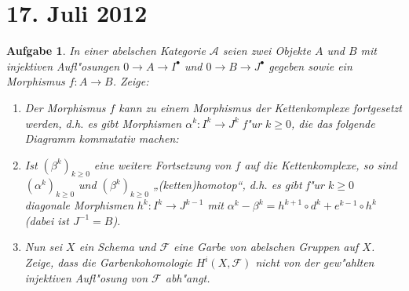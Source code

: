 \documentclass[paper = A4, fontsize=12pt, numbers=noendperiod, chapterprefix=true]{scrbook}
\theoremstyle{break}
\newtheorem{Aufg}{Aufgabe}
\theoremstyle{nonumberbreak}
\theoremstyle{nonumberplain}
\newcommand{\F}{\mathcal{F}} %
\begin{document}
\newpage
\section{17. Juli 2012}
\setcounter{Aufg}{0}
\setcounter{Loes}{0}

\begin{Aufg}
In einer abelschen Kategorie $\mathcal{A}$ seien zwei Objekte $A$ und $B$ mit injektiven Aufl"osungen $0 \to A \to I^\bullet$ und $0 \to B \to J^\bullet$ gegeben sowie ein Morphismus $f \colon A \to B$. Zeige:
\begin{enumerate}%
 \item Der Morphismus $f$ kann zu einem Morphismus der Kettenkomplexe fortgesetzt werden, d.h. es gibt Morphismen $\alpha^k\colon I^k \to J^k$ f"ur $k \geq 0$, die das folgende Diagramm kommutativ machen:
    \begin{center}
  \end{center}
\item Ist $(\beta^k)_{k \geq 0}$ eine weitere Fortsetzung von $f$ auf die Kettenkomplexe, so sind $(\alpha^k)_{k \geq 0}$ und $(\beta^k)_{k\geq 0}$ „(ketten)homotop“, d.h. es gibt f"ur $k \geq 0$ diagonale Morphismen 
 $h^k \colon I^k \to J^{k-1}$ mit $\alpha^k - \beta^k = h^{k+1} \circ d^k + e^{k-1} \circ h^k$ (dabei ist $J^{-1} = B$).
\item Nun sei $X$ ein Schema und $\F$ eine Garbe von abelschen Gruppen auf $X$. Zeige, dass die Garbenkohomologie $H^i(X, \F)$ nicht von der gew"ahlten injektiven Aufl"osung von $\F$ abh"angt. 
\end{enumerate}
\end{Aufg}
\end{document}
